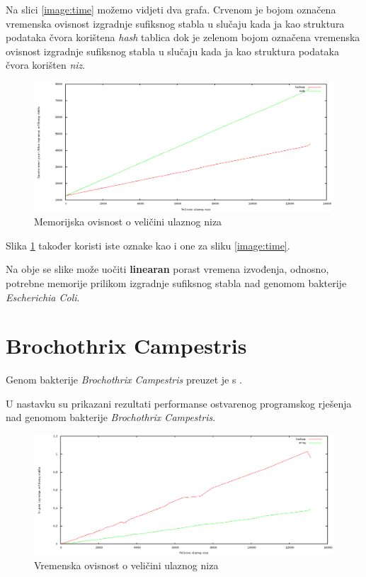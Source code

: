 \documentclass[times, utf8, seminar, numeric]{fer}
\begin{document}
Na slici \ref{image:time} možemo vidjeti dva grafa. Crvenom je bojom označena vremenska ovisnost izgradnje sufiksnog stabla u slučaju kada ja kao struktura podataka čvora korištena \textit{hash} tablica dok je zelenom bojom označena vremenska ovisnost izgradnje sufiksnog stabla u slučaju kada ja kao struktura podataka čvora korišten \textit{niz}.

\pagebreak %
\begin{figure}[h!]	
	\centering
	\includegraphics[width=1\textwidth]{media/memory_1.png}
	\caption{Memorijska ovisnost o veličini ulaznog niza}
	\label{image:memory}
\end{figure}

Slika \ref{image:memory} također koristi iste oznake kao i one za sliku \ref{image:time}. 

Na obje se slike može uočiti \textbf{linearan} porast vremena izvođenja, odnosno, potrebne memorije prilikom izgradnje sufiksnog stabla nad genomom bakterije \textit{Escherichia Coli}.


\section{Brochothrix Campestris}
	Genom bakterije \textit{Brochothrix Campestris} preuzet je s \cite{klamidija}. 
	
	U nastavku su prikazani rezultati performanse ostvarenog programskog rješenja nad genomom bakterije \textit{Brochothrix Campestris}.

\begin{figure}[h!]	
	\centering
	\includegraphics[width=1\textwidth]{media/time_2.png}
	\caption{Vremenska ovisnost o veličini ulaznog niza}
	\label{image:time1}
\end{figure}
\end{document}
